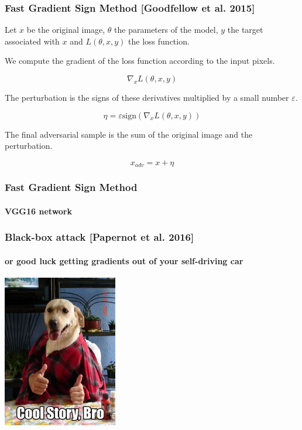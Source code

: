 \documentclass[9pt]{beamer}
\begin{document}
\begin{frame}
  \frametitle{Fast Gradient Sign Method [Goodfellow et al. 2015]}

  Let $x$ be the original image, $\theta$ the parameters of the model,
  $y$ the target associated with $x$ and $L(\theta, x, y)$ the loss
  function.

  \bigskip

  We compute the gradient of the loss function according to the input
  pixels.

  \[
  \nabla_{x} L(\theta, x, y)
  \]

  \bigskip

  The perturbation is the signs of these derivatives multiplied by a
  small number $\varepsilon$.

  \[
  \eta = \varepsilon \text{sign}(\nabla_{x} L(\theta, x, y))
  \]

  \bigskip

  The final adversarial sample is the sum of the original image and
  the perturbation.

  \[
  x_{adv} = x + \eta
  \]

\end{frame}

\begin{frame}
  \frametitle{Fast Gradient Sign Method}

  \framesubtitle{\textbf{VGG16} network}

  \begin{center}
    
  \end{center}
\end{frame}

\begin{frame}
  \frametitle{Black-box attack [Papernot et al. 2016]}

  \framesubtitle{or good luck getting gradients out of your
    self-driving car}

  \begin{center}
    \includegraphics[width = 5cm]{images/cool_story_bro.jpg}
  \end{center}

\end{frame}
\end{document}
